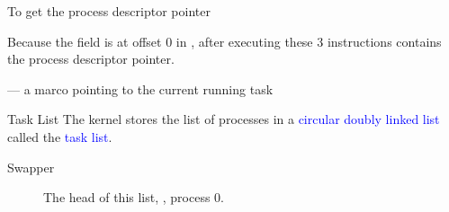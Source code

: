 \begin{frame}
  \begin{block}{To get the process descriptor pointer}
    \begin{center}
       
    \end{center}
    Because the  field is at offset 0 in , after executing
    these 3 instructions  contains the process descriptor pointer.
  \end{block}
  \begin{block}{ --- a marco pointing to the current running task}
    \begin{center}
    \end{center}
  \end{block}
\end{frame}

\begin{frame}{Task List}
  The kernel stores the list of processes in a \textcolor{blue}{circular doubly linked
    list} called the \textcolor{blue}{task list}.
  \begin{description}
  \item[Swapper] The head of this list, , process 0.
  \end{description}
  \begin{center}
  \end{center}
\end{frame}


